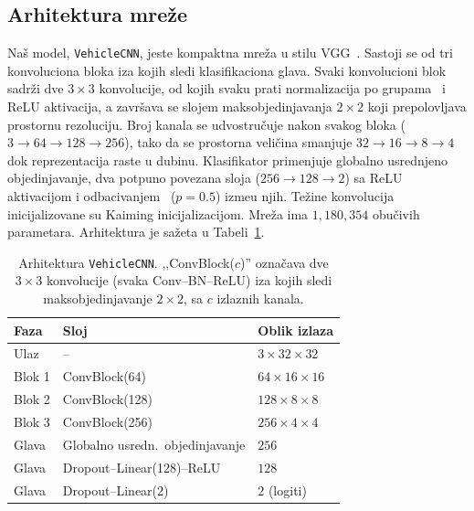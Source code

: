 \documentclass[11pt,a4paper]{article}
\begin{document}
\subsection{Arhitektura mre\v ze}
Na\v s model, \texttt{VehicleCNN}, jeste kompaktna mre\v za u stilu
VGG~\cite{simonyan2015very}. Sastoji se od tri konvoluciona bloka iza kojih
sledi klasifikaciona glava. Svaki konvolucioni blok sadr\v zi dve $3\times 3$
konvolucije, od kojih svaku prati normalizacija po
grupama~\cite{ioffe2015batch} i ReLU aktivacija, a zavr\v sava se slojem
maks\-objedinjavanja $2\times 2$ koji prepolovljava prostornu rezoluciju. Broj
kanala se udvostru\v cuje nakon svakog bloka ($3 \to 64 \to 128 \to 256$), tako
da se prostorna veli\v cina smanjuje $32 \to 16 \to 8 \to 4$ dok reprezentacija
raste u dubinu. Klasifikator primenjuje globalno usrednjeno objedinjavanje, dva
potpuno povezana sloja ($256 \to 128 \to 2$) sa ReLU aktivacijom i
odbacivanjem~\cite{srivastava2014dropout} ($p = 0.5$) izme\dj u njih. Te\v zine
konvolucija inicijalizovane su Kaiming inicijalizacijom. Mre\v za ima
$1{,}180{,}354$ obu\v civih parametara. Arhitektura je sa\v zeta u
Tabeli~\ref{tab:arch}.

\begin{table}[h]
\centering
\caption{Arhitektura \texttt{VehicleCNN}. ,,ConvBlock($c$)'' ozna\v cava dve
$3\times3$ konvolucije (svaka Conv--BN--ReLU) iza kojih sledi
maks\-objedinjavanje $2\times2$, sa $c$ izlaznih kanala.}
\label{tab:arch}
\begin{tabular}{lll}
\toprule
\textbf{Faza} & \textbf{Sloj} & \textbf{Oblik izlaza} \\
\midrule
Ulaz         & --                              & $3\times 32\times 32$ \\
Blok 1       & ConvBlock(64)                   & $64\times 16\times 16$ \\
Blok 2       & ConvBlock(128)                  & $128\times 8\times 8$ \\
Blok 3       & ConvBlock(256)                  & $256\times 4\times 4$ \\
Glava        & Globalno usredn.\ objedinjavanje & $256$ \\
Glava        & Dropout--Linear(128)--ReLU      & $128$ \\
Glava        & Dropout--Linear(2)              & $2$ (logiti) \\
\bottomrule
\end{tabular}
\end{table}
\end{document}
